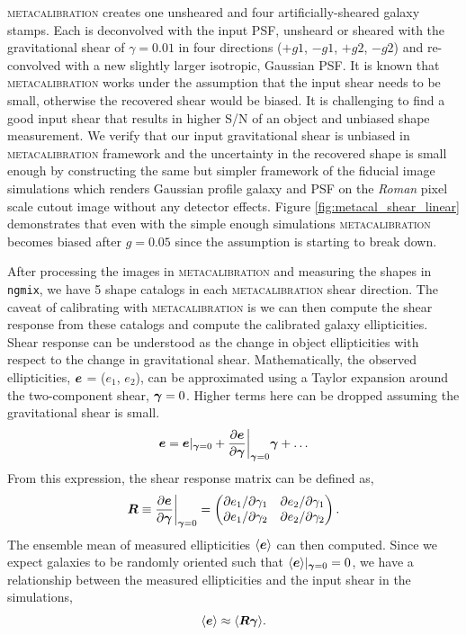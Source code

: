 {\textsc{metacalibration} creates one unsheared and four artificially-sheared galaxy stamps. Each is deconvolved with the input PSF, unsheard or sheared with the gravitational shear of $\gamma=0.01$ in four directions ($+g1$, $-g1$, $+g2$, $-g2$) and re-convolved with a new slightly larger isotropic, Gaussian PSF. It is known that \textsc{metacalibration} works under the assumption that the input shear needs to be small, otherwise the recovered shear would be biased. It is challenging to find a good input shear that results in higher S/N of an object and unbiased shape measurement. We verify that our input gravitational shear is unbiased in \textsc{metacalibration} framework and the uncertainty in the recovered shape is small enough by constructing the same but simpler framework of the fiducial image simulations which renders Gaussian profile galaxy and PSF on the \emph{Roman} pixel scale cutout image without any detector effects. Figure \ref{fig:metacal_shear_linear} demonstrates that even with the simple enough simulations \textsc{metacalibration} becomes biased after $g=0.05$ since the assumption is starting to break down. 

After processing the images in \textsc{metacalibration} and measuring the shapes in \texttt{ngmix}, we have 5 shape catalogs in each \textsc{metacalibration} shear direction. The caveat of calibrating with \textsc{metacalibration} is we can then compute the shear response from these catalogs and compute the calibrated galaxy ellipticities. Shear response can be understood as the change in object ellipticities with respect to the change in gravitational shear. Mathematically, the observed ellipticities, $\vb*{e}$ = ($e_{1}$, $e_{2}$), can be approximated using a Taylor expansion around the two-component shear, $\vb*{\gamma}=0$. Higher terms here can be dropped assuming the gravitational shear is small. 
\begin{equation}
    \vb*{e} = \vb*{e}\rvert_{\vb*{\gamma}=0} + \frac{\partial \vb*{e}}{\partial \vb*{\gamma}}\bigg\rvert_{\vb*{\gamma}=0}\vb*{\gamma} + \ldots
\end{equation}
From this expression, the shear response matrix can be defined as, 
\begin{equation}
    \vb*{R} \equiv \frac{\partial \vb*{e}}{\partial \vb*{\gamma}}\bigg\rvert_{\vb*{\gamma}=0} = 
    \begin{pmatrix}
        \partial e_{1}/\partial \gamma_{1} & \partial e_{2}/\partial \gamma_{1} \\ 
        \partial e_{1}/\partial \gamma_{2} & \partial e_{2}/\partial \gamma_{2}
    \end{pmatrix}. 
\end{equation}
The ensemble mean of measured ellipticities $\langle\vb*{e}\rangle$ can then computed. Since we expect galaxies to be randomly oriented such that $\langle\vb*{e}\rangle\rvert_{\vb*{\gamma}=0}=0$, we have a relationship between the measured ellipticities and the input shear in the simulations, 
\begin{equation}
    \langle\vb*{e}\rangle \approx \langle \vb*{R}\vb*{\gamma} \rangle. 
\end{equation} 

}
